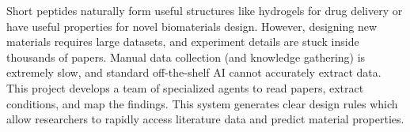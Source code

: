 
Short peptides naturally form useful structures like hydrogels for drug delivery or have useful properties for novel biomaterials design. However, designing new materials requires large datasets, and experiment details are stuck inside thousands of papers. Manual data collection (and knowledge gathering) is extremely slow, and standard off-the-shelf AI cannot accurately extract data. This project develops a team of specialized agents to read papers, extract conditions, and map the findings. This system generates clear design rules which allow researchers to rapidly access literature data and predict material properties.